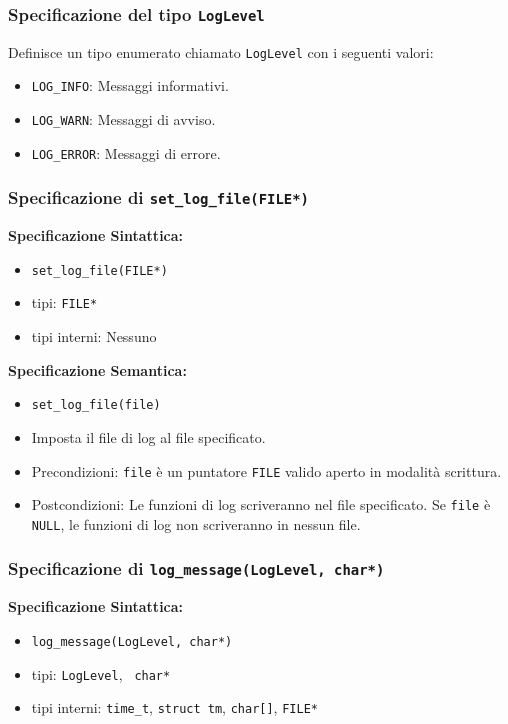 \documentclass[11pt]{scrartcl} %
\begin{document}
\subsubsection{Specificazione del tipo \texttt{LogLevel}}

Definisce un tipo enumerato chiamato \texttt{LogLevel} con i seguenti valori:
\begin{itemize}
	\item \texttt{LOG\_INFO}: Messaggi informativi.
	\item \texttt{LOG\_WARN}: Messaggi di avviso.
	\item \texttt{LOG\_ERROR}: Messaggi di errore.
\end{itemize}

\subsubsection{Specificazione di \texttt{set\_log\_file(FILE*)}}

\textbf{Specificazione Sintattica:}
\begin{itemize}
	\item \texttt{set\_log\_file(FILE*)}
	\item tipi: \texttt{FILE*}
	\item tipi interni: Nessuno
\end{itemize}

\textbf{Specificazione Semantica:}
\begin{itemize}
	\item \texttt{set\_log\_file(file)}
	\item Imposta il file di log al file specificato.
	\item Precondizioni: \texttt{file} è un puntatore \texttt{FILE} valido aperto in modalità scrittura.
	\item Postcondizioni: Le funzioni di log scriveranno nel file specificato. Se \texttt{file} è \texttt{NULL}, le funzioni di log non scriveranno in nessun file.
\end{itemize}



\subsubsection{Specificazione di \texttt{log\_message(LogLevel,  char*)}}

\textbf{Specificazione Sintattica:}
\begin{itemize}
	\item \texttt{log\_message(LogLevel,  char*)}
	\item tipi: \texttt{LogLevel}, \texttt{ char*}
	\item tipi interni: \texttt{time\_t}, \texttt{struct tm}, \texttt{char[]}, \texttt{FILE*}
\end{itemize}
\end{document}
